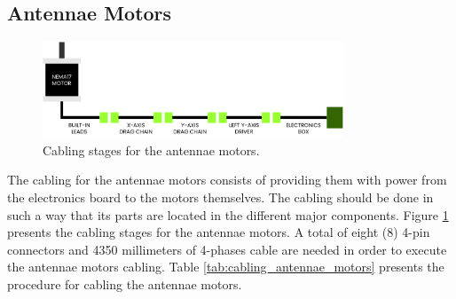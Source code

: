\documentclass{article}
\begin{document}
\subsection{Antennae Motors}
\begin{figure}[H]
    \centering
    \includegraphics[width=0.8\textwidth]{images/cabling/NEMA17_antennae.pdf}
    \caption{Cabling stages for the antennae motors.}
    \label{fig:cabling_antennae_motors}
\end{figure}
The cabling for the antennae motors consists of providing them with power from the electronics board to the motors themselves. The cabling should be done in such a way that its parts are located in the different major components. Figure \ref{fig:cabling_antennae_motors} presents the cabling stages for the antennae motors. A total of eight (8) 4-pin connectors and 4350 millimeters of 4-phases cable are needed in order to execute the antennae motors cabling. Table \ref{tab:cabling_antennae_motors} presents the procedure for cabling the antennae motors.
\end{document}
